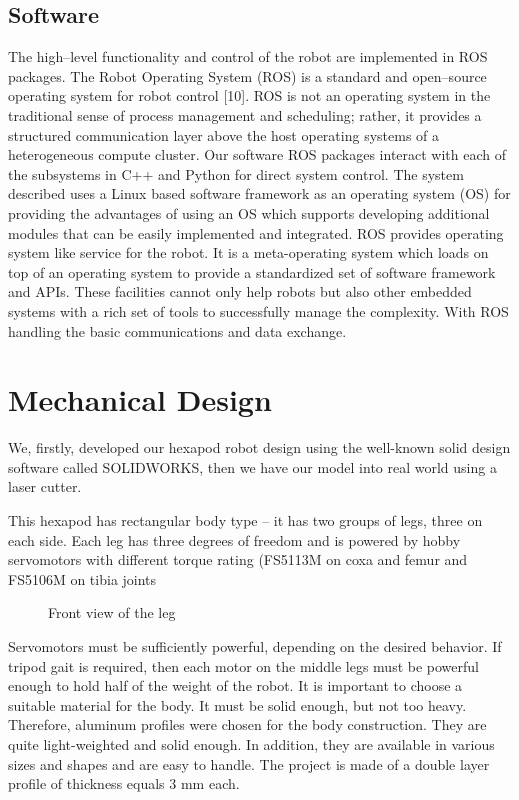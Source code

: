 \documentclass[conference]{IEEEtran}
\begin{document}
\subsection{Software}
The high–level functionality and control of the robot are implemented in ROS packages. The Robot Operating System (ROS) is a standard and open–source operating system for robot control [10]. ROS is not an operating system in the traditional sense of process management and scheduling; rather, it provides a structured communication layer above the host operating systems of a heterogeneous compute cluster. Our software ROS packages interact with each of the subsystems in C++ and Python for direct system control. The system described uses a Linux based software framework as an operating system (OS) for providing the advantages of using an OS which supports developing additional modules that can be easily implemented and integrated. ROS provides operating system like service for the robot. It is a meta-operating system which loads on top of an operating system to provide a standardized set of software framework and APIs. These facilities cannot only help robots but also other embedded systems with a rich set of tools to successfully manage the complexity. With ROS handling the basic communications and data exchange.

\section{Mechanical Design}
We, firstly, developed our hexapod robot design using the well-known solid design software called SOLIDWORKS, then we have our model into real world using a laser cutter.

This hexapod has rectangular body type – it has two groups of legs, three on each side. Each leg has three degrees of freedom and is powered by hobby servomotors with different torque rating (FS5113M on coxa and femur and FS5106M on tibia joints

\begin{figure}
    \centering
    \caption{Front view of the leg}
    \label{fig:untitled}
\end{figure}



Servomotors must be sufficiently powerful, depending on the desired behavior. If tripod gait is required, then each motor on the middle legs must be powerful enough to hold half of the weight of the robot.
It is important to choose a suitable material for the body. It must be solid enough, but not too heavy.
Therefore, aluminum profiles were chosen for the body construction. They are quite light-weighted and solid enough. In addition, they are available in various sizes and shapes and are easy to handle. The project is made of a double layer profile of thickness equals 3 mm each. 
\end{document}
